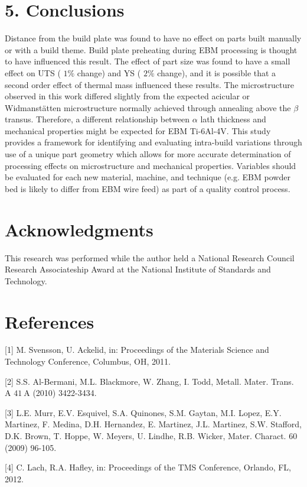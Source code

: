 \documentclass[10pt]{article}
\begin{document}
\section*{5. Conclusions}
Distance from the build plate was found to have no effect on parts built manually or with a build theme. Build plate preheating during EBM processing is thought to have influenced this result. The effect of part size was found to have a small effect on UTS ( $1 \%$ change) and YS ( $2 \%$ change), and it is possible that a second order effect of thermal mass influenced these results. The microstructure observed in this work differed slightly from the expected acicular or Widmanstätten microstructure normally achieved through annealing above the $\beta$ transus. Therefore, a different relationship between $\alpha$ lath thickness and mechanical properties might be expected for EBM Ti-6Al-4V. This study provides a framework for identifying and evaluating intra-build variations through use of a unique part geometry which allows for more accurate determination of processing effects on microstructure and mechanical properties. Variables should be evaluated for each new material, machine, and technique (e.g. EBM powder bed is likely to differ from EBM wire feed) as part of a quality control process.

\section*{Acknowledgments}
This research was performed while the author held a National Research Council Research Associateship Award at the National Institute of Standards and Technology.

\section*{References}
[1] M. Svensson, U. Ackelid, in: Proceedings of the Materials Science and Technology Conference, Columbus, OH, 2011.

[2] S.S. Al-Bermani, M.L. Blackmore, W. Zhang, I. Todd, Metall. Mater. Trans. A $41 \mathrm{~A}$ (2010) 3422-3434.

[3] L.E. Murr, E.V. Esquivel, S.A. Quinones, S.M. Gaytan, M.I. Lopez, E.Y. Martinez, F. Medina, D.H. Hernandez, E. Martinez, J.L. Martinez, S.W. Stafford, D.K. Brown, T. Hoppe, W. Meyers, U. Lindhe, R.B. Wicker, Mater. Charact. 60 (2009) 96-105.

[4] C. Lach, R.A. Hafley, in: Proceedings of the TMS Conference, Orlando, FL, 2012.
\end{document}
